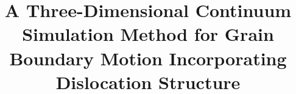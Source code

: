 %
%
%
%
%
%
%
\documentclass[smallextended]{svjour3}       %
%
\smartqed  %
%
\usepackage{lineno,hyperref}
\usepackage{amssymb,amsmath}
\usepackage{bm}
\usepackage{lipsum}
\usepackage{amsfonts}
\usepackage{graphicx,subfigure}
\usepackage{epstopdf}
\usepackage{algorithmic}
\usepackage{color}
\usepackage{tikz}

%
%
%
%
%







\title{A Three-Dimensional Continuum Simulation Method for Grain Boundary Motion Incorporating Dislocation Structure}%

